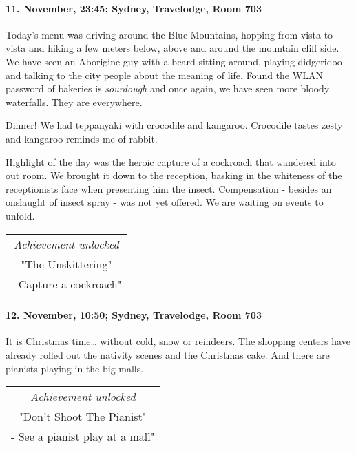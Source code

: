 \paragraph{11. November, 23:45; Sydney, Travelodge, Room 703}
Today's menu was driving around the Blue Mountains, hopping from vista to vista and hiking a few meters below, above and around the mountain cliff side.
We have seen an Aborigine guy with a beard sitting around, playing didgeridoo and talking to the city people about the meaning of life.
Found the WLAN password of bakeries is \emph{sourdough} and once again, we have seen more bloody waterfalls.
They are everywhere.

Dinner!
We had teppanyaki with crocodile and kangaroo.
Crocodile tastes zesty and kangaroo reminds me of rabbit.

Highlight of the day was the heroic capture of a cockroach that wandered into out room.
We brought it down to the reception, basking in the whiteness of the receptionists face when presenting him the insect.
Compensation - besides an onslaught of insect spray - was not yet offered.
We are waiting on events to unfold.

\begin{center}
\begin{tabular}{||c||}
\emph{Achievement unlocked}\\
"The Unskittering"\\
\multicolumn{1}{||p{0.8\textwidth}||}{\footnotesize - Capture a cockroach"} \\
\end{tabular}
\end{center}

\paragraph{12. November, 10:50; Sydney, Travelodge, Room 703}
It is Christmas time\ldots{} without cold, snow or reindeers.
The shopping centers have already rolled out the nativity scenes and the Christmas cake.
And there are pianists playing in the big malls.

\begin{center}
\begin{tabular}{||c||}
\emph{Achievement unlocked}\\
"Don't Shoot The Pianist"\\
\multicolumn{1}{||p{0.8\textwidth}||}{\footnotesize - See a pianist play at a mall"} \\
\end{tabular}
\end{center}

